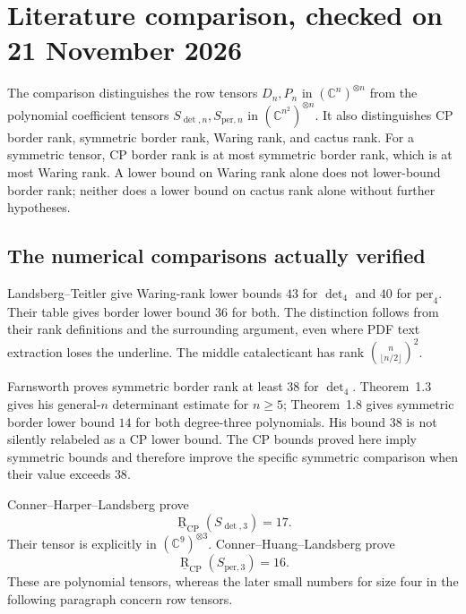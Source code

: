 \section{Literature comparison, checked on 21 November 2026}
\label{sec:literature}

The comparison distinguishes the row tensors $D_n,P_n$ in
$(\mathbb C^n)^{\otimes n}$ from the polynomial coefficient tensors
$S_{\det,n},S_{\mathrm{per},n}$ in
$(\mathbb C^{n^2})^{\otimes n}$. It also distinguishes CP border
rank, symmetric border rank, Waring rank, and cactus rank.
For a symmetric tensor, CP border rank is at most symmetric
border rank, which is at most Waring rank. A lower bound on
Waring rank alone does not lower-bound border rank; neither does
a lower bound on cactus rank alone without further hypotheses.

\subsection{The numerical comparisons actually verified}

Landsberg--Teitler \cite[Corollary~1.4, p.~2; \S9, pp.~13--14,
Table~3]{LT2010} give Waring-rank lower bounds $43$ for $\det_4$
and $40$ for $\mathrm{per}_4$. Their table gives border lower
bound $36$ for both. The distinction follows from their rank
definitions and the surrounding argument, even where PDF text
extraction loses the underline. The middle catalecticant has
rank $\binom{n}{\lfloor n/2\rfloor}^2$.

Farnsworth \cite[Theorem~1.6, p.~2]{Farnsworth2016} proves
symmetric border rank at least $38$ for $\det_4$.
Theorem~1.3 gives his general-$n$ determinant estimate for $n\geq5$;
Theorem~1.8 gives symmetric border lower bound $14$ for both
degree-three polynomials. His bound $38$ is not silently relabeled
as a CP lower bound. The CP bounds proved here imply symmetric
bounds and therefore improve the specific symmetric comparison
when their value exceeds $38$.

Conner--Harper--Landsberg
\cite[Theorem~1.2, \S1.2]{CHL2023} prove
\[
 \underline{\operatorname R}_{\mathrm{CP}}(S_{\det,3})=17.
\]
Their tensor is explicitly in $(\mathbb C^9)^{\otimes3}$.
Conner--Huang--Landsberg
\cite[Theorem~1.1 and the following identification, p.~3;
proof in \S5]{CHHL2023} prove
\[
 \underline{\operatorname R}_{\mathrm{CP}}(S_{\mathrm{per},3})=16.
\]
These are polynomial tensors, whereas the later small numbers
for size four in the following paragraph concern row tensors.

